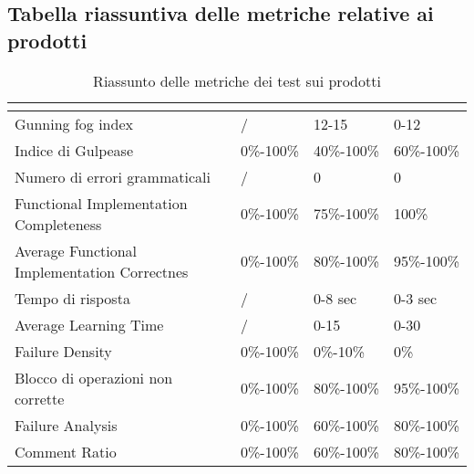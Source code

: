 \subsection{Tabella riassuntiva delle metriche relative ai prodotti}
\renewcommand{\arraystretch}{1.5}
\begin{table}[H]
	\centering
	\begin{tabular}{|C{4cm}|C{3cm}|C{3cm}|C{3cm}|}
		\hline
		\textbf{\color{title_text}{Nome Metrica}} & \textbf{\color{title_text}{Intervallo limite}} & \textbf{\color{title_text}{Range accettabile}} & \textbf{\color{title_text}{Range ottimale}} \\ \hline
		Gunning fog index & / &12-15&0-12 \\ \hline
		Indice di Gulpease & 0\%-100\%& 40\%-100\%& 60\%-100\% \\ \hline
		Numero di errori grammaticali & / & 0 & 0 \\ \hline
		Functional Implementation Completeness & 0\%-100\% & 75\%-100\% & 100\% \\ \hline
		Average Functional Implementation Correctnes&0\%-100\%&80\%-100\%&95\%-100\% \\ \hline
		Tempo di risposta & / &0-8 sec & 0-3 sec \\ \hline
		Average Learning Time& / &0-15 & 0-30 \\ \hline
		Failure Density&0\%-100\%&0\%-10\%&0\% \\ \hline
		Blocco di operazioni non corrette &0\%-100\%&80\%-100\%&95\%-100\% \\ \hline
		Failure Analysis&0\%-100\%&60\%-100\%&80\%-100\% \\ \hline
		Comment Ratio&0\%-100\%&60\%-100\%&80\%-100\%\\ \hline
	\end{tabular}
	\caption{Riassunto delle metriche dei test sui prodotti}
	\label{tabella:riassunto metriche dei test sui prodotti}
\end{table}
\renewcommand{\arraystretch}{1}
\pagebreak
